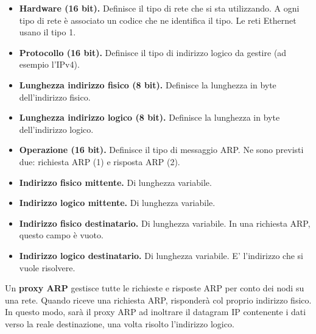             \begin{itemize}
                \item 
                    \textbf{Hardware (16 bit).} Definisce il tipo di rete che si sta utilizzando. A ogni tipo di rete è associato un codice che ne identifica il tipo. Le reti Ethernet usano il tipo 1.
                
                \item
                   \textbf{ Protocollo (16 bit).} Definisce il tipo di indirizzo logico da gestire (ad esempio l'IPv4).
                
                \item
                   \textbf{ Lunghezza indirizzo fisico (8 bit).} Definisce la lunghezza in byte dell'indirizzo fisico.
                    
                \item
                   \textbf{ Lunghezza indirizzo logico (8 bit).} Definisce la lunghezza in byte dell'indirizzo logico.
                    
                \item
                   \textbf{ Operazione (16 bit).} Definisce il tipo di messaggio ARP. Ne sono previsti due: richiesta ARP (1) e risposta ARP (2).
                    
                \item
                   \textbf{ Indirizzo fisico mittente.} Di lunghezza variabile.
                    
                \item
                   \textbf{ Indirizzo logico mittente.} Di lunghezza variabile.
                    
                \item
                   \textbf{ Indirizzo fisico destinatario.} Di lunghezza variabile. In una richiesta ARP, questo campo è vuoto.
                    
                \item
                   \textbf{ Indirizzo logico destinatario.} Di lunghezza variabile. E' l'indirizzo che si vuole risolvere.
            \end{itemize}
        
            Un \textbf{proxy ARP} gestisce tutte le richieste e risposte ARP per conto dei nodi su una rete. Quando riceve una richiesta ARP, risponderà col proprio indirizzo fisico. In questo modo, sarà il proxy ARP ad inoltrare il datagram IP contenente i dati verso la reale destinazione, una volta risolto l'indirizzo logico.
            
